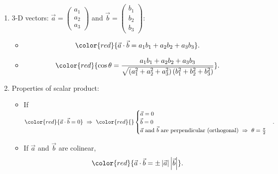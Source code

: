 \documentclass[12pt, a4paper]{article}
\begin{document}
\begin{enumerate}
\begin{itemize}
\begin{proof}{2.2.1}{}
\begin{figure}[H]
      \end{figure}
      By cosine rule: 
      $$\begin{aligned}
        \left|\vec{b}-\vec{a}\right|^2&=\left|\vec{a}\right|^2+\left|\vec{b}\right|^2-2\left|\vec{a}\right|\left|\vec{b}\right|\cos\theta\\
        \left|\vec{b}\right|^2-2\vec{a}\vec{b}+\left|\vec{a}\right|^2&=\left|\vec{a}\right|^2+\left|\vec{b}\right|^2-2\left|\vec{a}\right|\left|\vec{b}\right|\cos\theta\\
        \therefore \vec{a}\cdot\vec{b}&=\left|\vec{a}\right|\left|\vec{b}\right|\cos\theta.
      \end{aligned}$$
    \end{proof}
    \item Combining the two definitions: 
    $${\color{red}{\cos\theta=\frac{a_1b_1+a_2b_2}{\sqrt{\left(a_1^2+a_2^2\right)\left(b_1^2+b_2^2\right)}}}}.$$
  \end{itemize}
  \item 3-D vectors: $\vec{a}=\begin{pmatrix}a_1\\a_2\\a_3\end{pmatrix}$ and $\vec{b}=\begin{pmatrix}b_1\\b_2\\b_3\end{pmatrix}$: 
  \begin{itemize}
    \item $${\color{red}{\vec{a}\cdot\vec{b}=a_1b_1+a_2b_2+a_3b_3}}.$$
    \item $${\color{red}{\cos\theta=\frac{a_1b_1+a_2b_2+a_3b_3}{\sqrt{\left(a_1^2+a_2^2+a_3^2\right)\left(b_1^2+b_2^2+b_3^2\right)}}}}.$$
  \end{itemize}
  \item Properties of scalar product: 
  \begin{itemize}
    \item If ${\color{red}{\vec{a}\cdot\vec{b}=0}}\ \Rightarrow\ {\color{red}{}\begin{cases}\vec{a}=0\\\vec{b}=0\\\vec{a}\text{ and }\vec{b}\text{ are perpendicular (orthogonal)}\ \Rightarrow\ \theta=\frac{\pi}{2}\end{cases}}.$
    \item If $\vec{a}$ and $\vec{b}$ are colinear, $${\color{red}{\vec{a}\cdot\vec{b}=\pm\left|\vec{a}\right|\left|\vec{b}\right|}}.$$

\end{itemize}
\end{enumerate}
\end{document}
